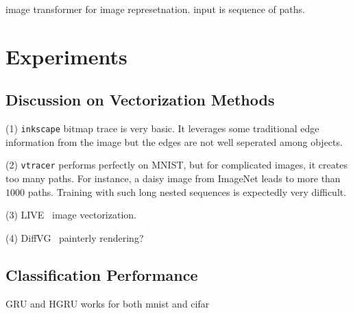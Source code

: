 \documentclass[10pt,twocolumn,letterpaper]{article}
\begin{document}
image transformer for image represetnation. input is sequence of paths.

\section{Experiments}

\subsection{Discussion on Vectorization Methods}

(1) \verb|inkscape| bitmap trace is very basic. It leverages some traditional
edge information from the image but the edges are not well seperated among
objects.

(2) \verb|vtracer| performs perfectly on MNIST, but for complicated images, it
creates too many paths. For instance, a daisy image from ImageNet leads to more
than $1000$ paths.  Training with such long nested sequences is expectedly very
difficult.

(3) LIVE~\cite{live} image vectorization.

(4) DiffVG~\cite{dvg} painterly rendering?

\subsection{Classification Performance}

GRU and HGRU works for both mnist and cifar
\end{document}
